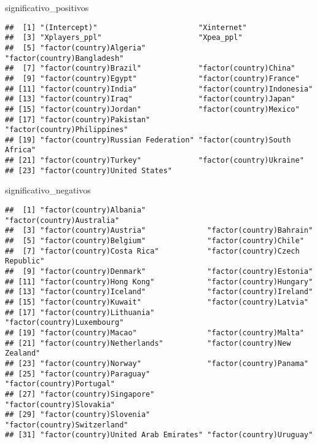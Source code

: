 \documentclass[
]{article}
\newenvironment{Shaded}{\begin{snugshade}}{\end{snugshade}}
\newcommand{\NormalTok}[1]{#1}
\begin{document}
\begin{Shaded}
\begin{Highlighting}[]
\NormalTok{significativo\_positivos}
\end{Highlighting}
\end{Shaded}

\begin{verbatim}
##  [1] "(Intercept)"                       "Xinternet"                        
##  [3] "Xplayers_ppl"                      "Xpea_ppl"                         
##  [5] "factor(country)Algeria"            "factor(country)Bangladesh"        
##  [7] "factor(country)Brazil"             "factor(country)China"             
##  [9] "factor(country)Egypt"              "factor(country)France"            
## [11] "factor(country)India"              "factor(country)Indonesia"         
## [13] "factor(country)Iraq"               "factor(country)Japan"             
## [15] "factor(country)Jordan"             "factor(country)Mexico"            
## [17] "factor(country)Pakistan"           "factor(country)Philippines"       
## [19] "factor(country)Russian Federation" "factor(country)South Africa"      
## [21] "factor(country)Turkey"             "factor(country)Ukraine"           
## [23] "factor(country)United States"
\end{verbatim}

\begin{Shaded}
\begin{Highlighting}[]
\NormalTok{significativo\_negativos}
\end{Highlighting}
\end{Shaded}

\begin{verbatim}
##  [1] "factor(country)Albania"              "factor(country)Australia"           
##  [3] "factor(country)Austria"              "factor(country)Bahrain"             
##  [5] "factor(country)Belgium"              "factor(country)Chile"               
##  [7] "factor(country)Costa Rica"           "factor(country)Czech Republic"      
##  [9] "factor(country)Denmark"              "factor(country)Estonia"             
## [11] "factor(country)Hong Kong"            "factor(country)Hungary"             
## [13] "factor(country)Iceland"              "factor(country)Ireland"             
## [15] "factor(country)Kuwait"               "factor(country)Latvia"              
## [17] "factor(country)Lithuania"            "factor(country)Luxembourg"          
## [19] "factor(country)Macao"                "factor(country)Malta"               
## [21] "factor(country)Netherlands"          "factor(country)New Zealand"         
## [23] "factor(country)Norway"               "factor(country)Panama"              
## [25] "factor(country)Paraguay"             "factor(country)Portugal"            
## [27] "factor(country)Singapore"            "factor(country)Slovakia"            
## [29] "factor(country)Slovenia"             "factor(country)Switzerland"         
## [31] "factor(country)United Arab Emirates" "factor(country)Uruguay"
\end{verbatim}
\end{document}
